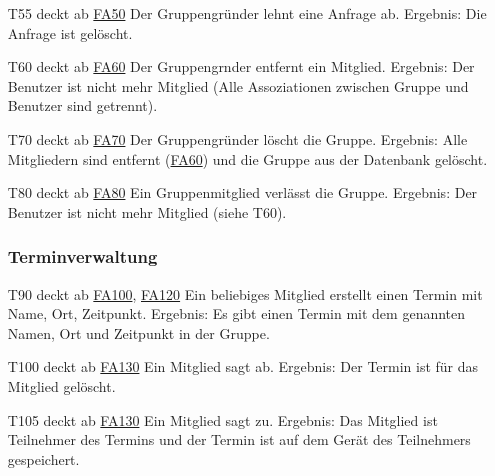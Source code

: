 \documentclass{scrartcl}
\begin{document}
\begin{itemize}
	\item[T55] deckt ab \hyperlink{FA50}{FA50}  \newline
	Der Gruppengründer lehnt eine Anfrage ab. \newline
	Ergebnis: Die Anfrage ist gelöscht.
	
	\item[T60] deckt ab \hyperlink{FA60}{FA60}  \newline
	Der Gruppengrnder entfernt ein Mitglied.  \newline
	Ergebnis: Der Benutzer ist nicht mehr Mitglied (Alle Assoziationen zwischen Gruppe und Benutzer sind getrennt).
	
	\item[T70] deckt ab \hyperlink{FA70}{FA70}  \newline
	Der Gruppengründer löscht die Gruppe.  \newline
	Ergebnis: Alle Mitgliedern sind entfernt (\hyperlink{FA60}{FA60}) und die Gruppe aus der Datenbank gelöscht.
	
	\item[T80] deckt ab \hyperlink{FA80}{FA80}  \newline
	Ein Gruppenmitglied verlässt die Gruppe.  \newline
	Ergebnis: Der Benutzer ist nicht mehr Mitglied (siehe T60).
	
	\subsubsection{Terminverwaltung}
	
	\item[T90] deckt ab \hyperlink{FA100}{FA100}, \hyperlink{FA120}{FA120}  \newline
	Ein beliebiges Mitglied erstellt einen Termin mit Name, Ort, Zeitpunkt.  \newline
	Ergebnis: Es gibt einen Termin mit dem genannten Namen, Ort und Zeitpunkt in der Gruppe.
	
	\item [T100] deckt ab \hyperlink{FA130}{FA130}  \newline
	Ein Mitglied sagt ab.  \newline
	Ergebnis: Der Termin ist für das Mitglied gelöscht.
	
	\item[T105] deckt ab \hyperlink{FA130}{FA130}  \newline
	Ein Mitglied sagt zu.  \newline
	Ergebnis: Das Mitglied ist Teilnehmer des Termins und der Termin ist auf dem Gerät des Teilnehmers gespeichert.
	

\end{itemize}
\end{document}
